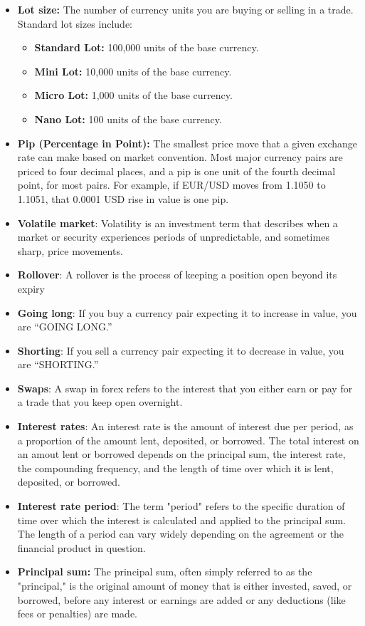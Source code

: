 \documentclass{report}
\begin{document}
\begin{itemize}
         \item \textbf{Lot size:} The number of currency units you are buying or selling in a trade. Standard lot sizes include:
             \begin{itemize}
                 \item \textbf{Standard Lot:} 100,000 units of the base currency.
                 \item \textbf{Mini Lot:} 10,000 units of the base currency.
                 \item \textbf{Micro Lot:} 1,000 units of the base currency.
                 \item \textbf{Nano Lot:} 100 units of the base currency.
             \end{itemize}
            \item \textbf{Pip (Percentage in Point):}
                The smallest price move that a given exchange rate can make based on market convention. Most major currency pairs are priced to four decimal places, and a pip is one unit of the fourth decimal point, for most pairs. For example, if EUR/USD moves from 1.1050 to 1.1051, that 0.0001 USD rise in value is one pip.
            \item \textbf{Volatile market}: Volatility is an investment term that describes when a market or security experiences periods of unpredictable, and sometimes sharp, price movements.
        \item \textbf{Rollover}: A rollover is the process of keeping a position open beyond its expiry
        \item \textbf{Going long}: If you buy a currency pair expecting it to increase in value, you are “GOING LONG.”
        \item \textbf{Shorting}: If you sell a currency pair expecting it to decrease in value, you are “SHORTING.”
        \item \textbf{Swaps}: A swap in forex refers to the interest that you either earn or pay for a trade that you keep open overnight.
        \item \textbf{Interest rates}: An interest rate is the amount of interest due per period, as a proportion of the amount lent, deposited, or borrowed. The total interest on an amout lent or borrowed depends on the principal sum, the interest rate, the compounding frequency, and the length of time over which it is lent, deposited, or borrowed.
        \item \textbf{Interest rate period}: The term "period" refers to the specific duration of time over which the interest is calculated and applied to the principal sum. The length of a period can vary widely depending on the agreement or the financial product in question.
        \item \textbf{Principal sum:} The principal sum, often simply referred to as the "principal," is the original amount of money that is either invested, saved, or borrowed, before any interest or earnings are added or any deductions (like fees or penalties) are made.
     \end{itemize}
\end{document}
